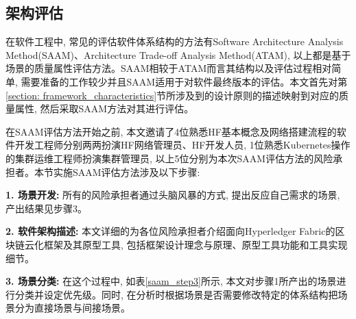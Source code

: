 \subsection{架构评估}

在软件工程中, 常见的评估软件体系结构的方法有Software Architecture Analysis Method(SAAM)、Architecture Trade-off Analysis Method(ATAM), 以上都是基于场景的质量属性评估方法\cite{ionita2002scenario}。SAAM相较于ATAM而言其结构以及评估过程相对简单, 需要准备的工作较少并且SAAM适用于对软件最终版本的评估\cite{huhonglei2004}。本文首先对第\ref{section: framework_characteristics}节所涉及到的设计原则的描述映射到对应的质量属性, 然后采取SAAM方法对其进行评估。

在SAAM评估方法开始之前, 本文邀请了4位熟悉HF基本概念及网络搭建流程的软件开发工程师分别两两扮演HF网络管理员、HF开发人员, 1位熟悉Kubernetes操作的集群运维工程师扮演集群管理员, 以上5位分别为本次SAAM评估方法的风险承担者。本节实施SAAM评估方法涉及以下步骤:

\textbf{1. 场景开发: }所有的风险承担者通过头脑风暴的方式, 提出反应自己需求的场景, 产出结果见步骤3。

\textbf{2. 软件架构描述: }本文详细的为各位风险承担者介绍面向Hyperledger Fabric的区块链云化框架及其原型工具, 包括框架设计理念与原理、原型工具功能和工具实现细节。

\textbf{3. 场景分类: }在这个过程中, 如表\ref{saam_step3}所示, 本文对步骤1所产出的场景进行分类并设定优先级。同时, 在分析时根据场景是否需要修改特定的体系结构把场景分为直接场景与间接场景。

